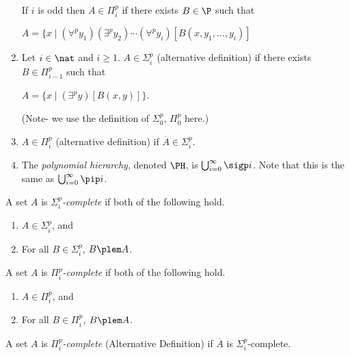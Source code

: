 \documentclass[12pt]{article}
\begin{document}
\begin{definition}
\begin{enumerate}
If $i$ is odd then
$A\in \Pi_i^p$ if there exists $B\in \P$ such that

$A= \{ x \mid (\forall^p y_1)(\exists^p y_2)\cdots(\forall^p y_i)[B(x,y_1,\ldots,y_i)]$

\item
Let $i\in\nat$ and $i\ge 1$.
$A\in \Sigma_i^p$ (alternative definition) if there exists $B\in \Pi_{i-1}^p$ such that

$A= \{ x \mid (\exists^p y)[B(x,y)] \}$.

(Note- we use the definition of $\Sigma_0^p$, $\Pi_0^p$ here.)

\item
$A\in \Pi_i^p$ (alternative definition) 
if $\overline{A}\in \Sigma_i^p$.

\item
The {\it polynomial hierarchy}, denoted $\PH$, is $\bigcup_{i=0}^\infty \sigp i$.
Note that this is the same as $\bigcup_{i=0}^\infty \pip i$.


\end{enumerate}
\end{definition}

\begin{definition}
A set $A$ is {\it $\Sigma_i^p$-complete}
if both of the following hold.
\begin{enumerate}
\item
$A\in \Sigma_i^p$, and
\item
For all $B\in \Sigma_i^p$, $B\plem A$.
\end{enumerate}
\end{definition}

\begin{definition}
A set $A$ is {\it $\Pi_i^p$-complete}
if both of the following hold.
\begin{enumerate}
\item
$A\in \Pi_i^p$, and
\item
For all $B\in \Pi_i^p$, $B\plem A$.
\end{enumerate}
\end{definition}

\begin{definition}
A set $A$ is {\it $\Pi_i^p$-complete} (Alternative Definition)
if $\overline{A}$ is $\Sigma_i^p$-complete.
\end{definition}


\end{document}

